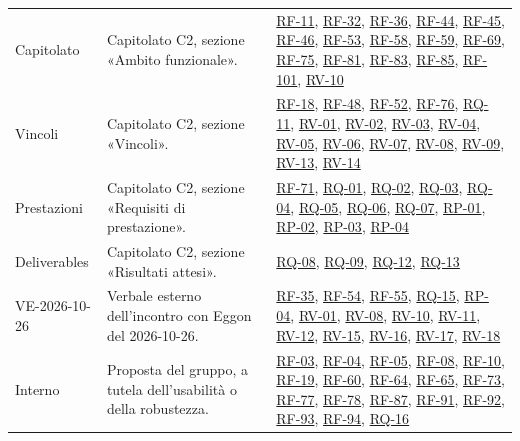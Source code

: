 \documentclass[documento]{gpt}
\begin{document}
{\begin{longtable}{@{}p{2.6cm}>{\raggedright\arraybackslash}p{7.0cm}>{\raggedright\arraybackslash}p{5.2cm}@{}}
\mbox{Capitolato} & Capitolato C2, sezione «Ambito funzionale». & \hyperlink{req:RF-11}{RF-11}, \hyperlink{req:RF-32}{RF-32}, \hyperlink{req:RF-36}{RF-36}, \hyperlink{req:RF-44}{RF-44}, \hyperlink{req:RF-45}{RF-45}, \hyperlink{req:RF-46}{RF-46}, \hyperlink{req:RF-53}{RF-53}, \hyperlink{req:RF-58}{RF-58}, \hyperlink{req:RF-59}{RF-59}, \hyperlink{req:RF-69}{RF-69}, \hyperlink{req:RF-75}{RF-75}, \hyperlink{req:RF-81}{RF-81}, \hyperlink{req:RF-83}{RF-83}, \hyperlink{req:RF-85}{RF-85}, \hyperlink{req:RF-101}{RF-101}, \hyperlink{req:RV-10}{RV-10} \\
\mbox{Vincoli} & Capitolato C2, sezione «Vincoli». & \hyperlink{req:RF-18}{RF-18}, \hyperlink{req:RF-48}{RF-48}, \hyperlink{req:RF-52}{RF-52}, \hyperlink{req:RF-76}{RF-76}, \hyperlink{req:RQ-11}{RQ-11}, \hyperlink{req:RV-01}{RV-01}, \hyperlink{req:RV-02}{RV-02}, \hyperlink{req:RV-03}{RV-03}, \hyperlink{req:RV-04}{RV-04}, \hyperlink{req:RV-05}{RV-05}, \hyperlink{req:RV-06}{RV-06}, \hyperlink{req:RV-07}{RV-07}, \hyperlink{req:RV-08}{RV-08}, \hyperlink{req:RV-09}{RV-09}, \hyperlink{req:RV-13}{RV-13}, \hyperlink{req:RV-14}{RV-14} \\
\mbox{Prestazioni} & Capitolato C2, sezione «Requisiti di prestazione». & \hyperlink{req:RF-71}{RF-71}, \hyperlink{req:RQ-01}{RQ-01}, \hyperlink{req:RQ-02}{RQ-02}, \hyperlink{req:RQ-03}{RQ-03}, \hyperlink{req:RQ-04}{RQ-04}, \hyperlink{req:RQ-05}{RQ-05}, \hyperlink{req:RQ-06}{RQ-06}, \hyperlink{req:RQ-07}{RQ-07}, \hyperlink{req:RP-01}{RP-01}, \hyperlink{req:RP-02}{RP-02}, \hyperlink{req:RP-03}{RP-03}, \hyperlink{req:RP-04}{RP-04} \\
\mbox{Deliverables} & Capitolato C2, sezione «Risultati attesi». & \hyperlink{req:RQ-08}{RQ-08}, \hyperlink{req:RQ-09}{RQ-09}, \hyperlink{req:RQ-12}{RQ-12}, \hyperlink{req:RQ-13}{RQ-13} \\
\mbox{VE-2026-10-26} & Verbale esterno dell'incontro con Eggon del 2026-10-26. & \hyperlink{req:RF-35}{RF-35}, \hyperlink{req:RF-54}{RF-54}, \hyperlink{req:RF-55}{RF-55}, \hyperlink{req:RQ-15}{RQ-15}, \hyperlink{req:RP-04}{RP-04}, \hyperlink{req:RV-01}{RV-01}, \hyperlink{req:RV-08}{RV-08}, \hyperlink{req:RV-10}{RV-10}, \hyperlink{req:RV-11}{RV-11}, \hyperlink{req:RV-12}{RV-12}, \hyperlink{req:RV-15}{RV-15}, \hyperlink{req:RV-16}{RV-16}, \hyperlink{req:RV-17}{RV-17}, \hyperlink{req:RV-18}{RV-18} \\
\mbox{Interno} & Proposta del gruppo, a tutela dell'usabilità o della robustezza. & \hyperlink{req:RF-03}{RF-03}, \hyperlink{req:RF-04}{RF-04}, \hyperlink{req:RF-05}{RF-05}, \hyperlink{req:RF-08}{RF-08}, \hyperlink{req:RF-10}{RF-10}, \hyperlink{req:RF-19}{RF-19}, \hyperlink{req:RF-60}{RF-60}, \hyperlink{req:RF-64}{RF-64}, \hyperlink{req:RF-65}{RF-65}, \hyperlink{req:RF-73}{RF-73}, \hyperlink{req:RF-77}{RF-77}, \hyperlink{req:RF-78}{RF-78}, \hyperlink{req:RF-87}{RF-87}, \hyperlink{req:RF-91}{RF-91}, \hyperlink{req:RF-92}{RF-92}, \hyperlink{req:RF-93}{RF-93}, \hyperlink{req:RF-94}{RF-94}, \hyperlink{req:RQ-16}{RQ-16} \\

\end{longtable}}
\end{document}
